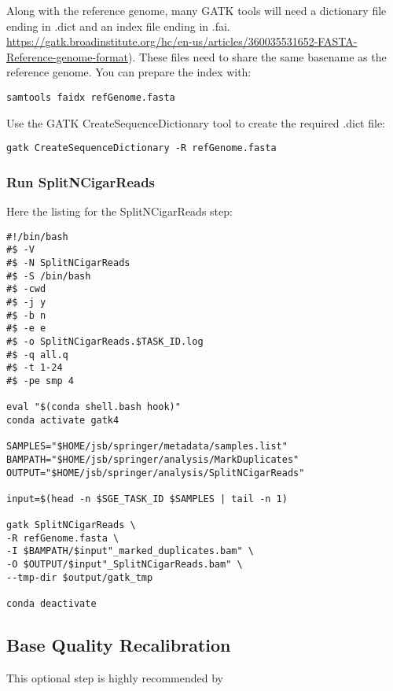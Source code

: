 Along with the reference genome, many GATK tools will need a dictionary file ending in .dict and an index file ending in .fai.\href{ https://gatk.broadinstitute.org/hc/en-us/articles/360035531652-FASTA-Reference-genome-format} { https://gatk.broadinstitute.org/hc/en-us/articles/360035531652-FASTA-Reference-genome-format}). These files need to share the same basename as the reference genome. You can prepare the index with:

\begin{verbatim}
samtools faidx refGenome.fasta
\end{verbatim}

Use the GATK CreateSequenceDictionary tool to create the required .dict file:

\begin{verbatim}
gatk CreateSequenceDictionary -R refGenome.fasta
\end{verbatim}

\subsubsection{Run SplitNCigarReads}

Here the listing for the SplitNCigarReads step:

\begin{verbatim}
#!/bin/bash
#$ -V
#$ -N SplitNCigarReads
#$ -S /bin/bash
#$ -cwd
#$ -j y
#$ -b n
#$ -e e
#$ -o SplitNCigarReads.$TASK_ID.log
#$ -q all.q
#$ -t 1-24
#$ -pe smp 4

eval "$(conda shell.bash hook)"
conda activate gatk4

SAMPLES="$HOME/jsb/springer/metadata/samples.list"
BAMPATH="$HOME/jsb/springer/analysis/MarkDuplicates"
OUTPUT="$HOME/jsb/springer/analysis/SplitNCigarReads"

input=$(head -n $SGE_TASK_ID $SAMPLES | tail -n 1)

gatk SplitNCigarReads \
-R refGenome.fasta \
-I $BAMPATH/$input"_marked_duplicates.bam" \
-O $OUTPUT/$input"_SplitNCigarReads.bam" \
--tmp-dir $output/gatk_tmp

conda deactivate
\end{verbatim}




\subsection{Base Quality Recalibration}

This optional step is highly recommended by 



